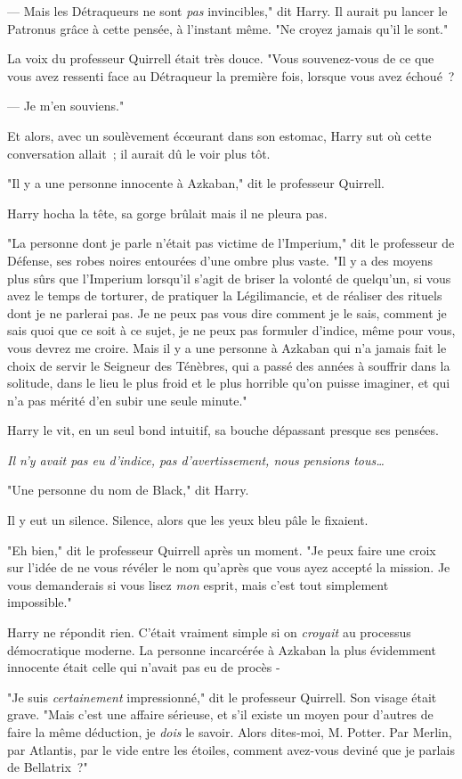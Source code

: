 --- Mais les Détraqueurs ne sont \emph{pas} invincibles," dit Harry. Il aurait pu lancer le Patronus grâce à cette pensée, à l'instant même. "Ne croyez jamais qu'il le sont."

La voix du professeur Quirrell était très douce. "Vous souvenez-vous de ce que vous avez ressenti face au Détraqueur la première fois, lorsque vous avez échoué~?

--- Je m'en souviens."

Et alors, avec un soulèvement écœurant dans son estomac, Harry sut où cette conversation allait~; il aurait dû le voir plus tôt.

"Il y a une personne innocente à Azkaban," dit le professeur Quirrell.

Harry hocha la tête, sa gorge brûlait mais il ne pleura pas.

"La personne dont je parle n'était pas victime de l'Imperium," dit le professeur de Défense, ses robes noires entourées d'une ombre plus vaste. "Il y a des moyens plus sûrs que l'Imperium lorsqu'il s'agit de briser la volonté de quelqu'un, si vous avez le temps de torturer, de pratiquer la Légilimancie, et de réaliser des rituels dont je ne parlerai pas. Je ne peux pas vous dire comment je le sais, comment je sais quoi que ce soit à ce sujet, je ne peux pas formuler d'indice, même pour vous, vous devrez me croire. Mais il y a une personne à Azkaban qui n'a jamais fait le choix de servir le Seigneur des Ténèbres, qui a passé des années à souffrir dans la solitude, dans le lieu le plus froid et le plus horrible qu'on puisse imaginer, et qui n'a pas mérité d'en subir une seule minute."

Harry le vit, en un seul bond intuitif, sa bouche dépassant presque ses pensées.

\emph{Il n'y avait pas eu d'indice, pas d'avertissement, nous pensions tous…}

"Une personne du nom de Black," dit Harry.

Il y eut un silence. Silence, alors que les yeux bleu pâle le fixaient.

"Eh bien," dit le professeur Quirrell après un moment. "Je peux faire une croix sur l'idée de ne vous révéler le nom qu'après que vous ayez accepté la mission. Je vous demanderais si vous lisez \emph{mon} esprit, mais c'est tout simplement impossible."

Harry ne répondit rien. C'était vraiment simple si on \emph{croyait} au processus démocratique moderne. La personne incarcérée à Azkaban la plus évidemment innocente était celle qui n'avait pas eu de procès -

"Je suis \emph{certainement} impressionné," dit le professeur Quirrell. Son visage était grave. "Mais c'est une affaire sérieuse, et s'il existe un moyen pour d'autres de faire la même déduction, je \emph{dois} le savoir. Alors dites-moi, M. Potter. Par Merlin, par Atlantis, par le vide entre les étoiles, comment avez-vous deviné que je parlais de Bellatrix~?" 


